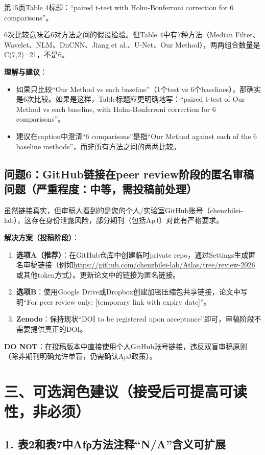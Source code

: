 \documentclass[12pt]{article}
\begin{document}
第15页Table 4标题：“paired t-test with Holm-Bonferroni correction for 6 comparisons”。

6次比较意味着6对方法之间的假设检验。但Table 4中有7种方法（Median Filter、Wavelet、NLM、DnCNN、Jiang et al.、U-Net、Our Method），两两组合数量是C(7,2)=21，不是6。

\textbf{理解与建议}：
\begin{itemize}
    \item 如果只比较“Our Method vs each baseline”（1个test vs 6个baselines），那确实是6次比较。如果是这样，Table标题应更明确地写：“paired t-test of Our Method vs each baseline, with Holm-Bonferroni correction for 6 comparisons”。
    \item 建议在caption中澄清“6 comparisons”是指“Our Method against each of the 6 baseline methods”，而非所有方法之间的两两比较。
\end{itemize}

\subsection{问题6：GitHub链接在peer review阶段的匿名审稿问题（严重程度：中等，需投稿前处理）}

虽然链接真实，但审稿人看到的是您的个人/实验室GitHub账号（chenzhilei-lab），这存在身份泄露风险，部分期刊（包括ApJ）对此有严格要求。

\textbf{解决方案（投稿阶段）}：
\begin{enumerate}
    \item \textbf{选项A（推荐）}：在GitHub仓库中创建临时private repo，通过Settings生成匿名审稿链接（例如\url{https://github.com/chenzhilei-lab/Atlas/tree/review-2026}或其他token方式）。更新论文中的链接为匿名链接。
    \item \textbf{选项B}：使用Google Drive或Dropbox创建加密压缩包共享链接，论文中写明“For peer review only: [temporary link with expiry date]”。
    \item \textbf{Zenodo}：保持现状“DOI to be registered upon acceptance”即可，审稿阶段不需要提供真正的DOI。
\end{enumerate}
\textbf{DO NOT}：在投稿版本中直接使用个人GitHub账号链接，违反双盲审稿原则（除非期刊明确允许单盲，仍需确认ApJ政策）。

\section{三、可选润色建议（接受后可提高可读性，非必须）}

\subsection{1. 表2和表7中Afρ方法注释“N/A”含义可扩展}
\end{document}

